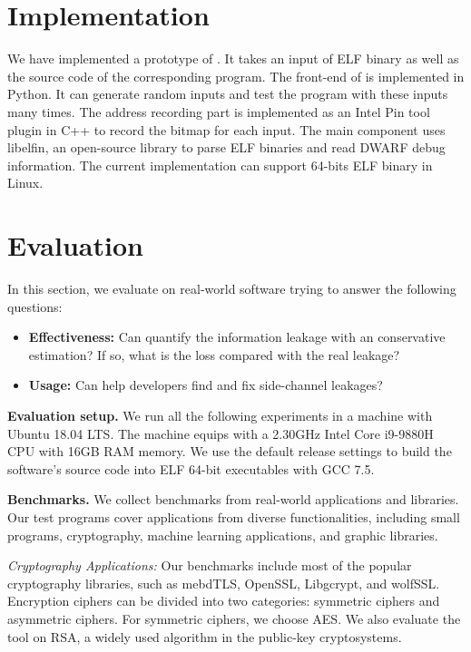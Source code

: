 \section{Implementation}
We have implemented a prototype of \ctool{}. It takes an input of ELF binary as well as the source code of the corresponding program. The front-end of \ctool{} is implemented in Python. It can generate random inputs and test the program with these inputs many times.  The address recording part is implemented as an Intel Pin tool plugin in C++ to record the bitmap for each input. The main component uses \textsf{libelfin}, an open-source library to parse ELF binaries and read DWARF debug information. The current implementation can support  64-bits ELF binary in Linux. 

\section{Evaluation}
In this section, we evaluate \ctool{} on real-world software trying to answer the following questions:

\begin{itemize}
\item \textbf{Effectiveness:} Can \ctool{} quantify the information leakage with an conservative estimation? If so, what is the loss compared with the real leakage?
\item \textbf{Usage:}  Can \ctool{} help developers find and fix side-channel leakages?
\end{itemize}

\textbf{Evaluation setup.} We run all the following experiments in a machine with Ubuntu 18.04 LTS. The machine equips with a 2.30GHz Intel Core i9-9880H CPU with 16GB RAM memory. We use the default release settings to build the software's source code into ELF 64-bit executables with GCC 7.5. 

\textbf{Benchmarks.} 
We collect benchmarks from real-world applications and libraries. Our test programs cover applications from diverse functionalities, including small programs, cryptography, machine learning applications, and graphic libraries. 



\textit{Cryptography Applications:} Our benchmarks include most of the popular cryptography libraries, such as mebdTLS, OpenSSL, Libgcrypt, and wolfSSL. Encryption ciphers can be divided into two categories:  symmetric ciphers and asymmetric ciphers. For symmetric ciphers, we choose AES. We also evaluate the tool on RSA, a widely used algorithm in the public-key cryptosystems.


